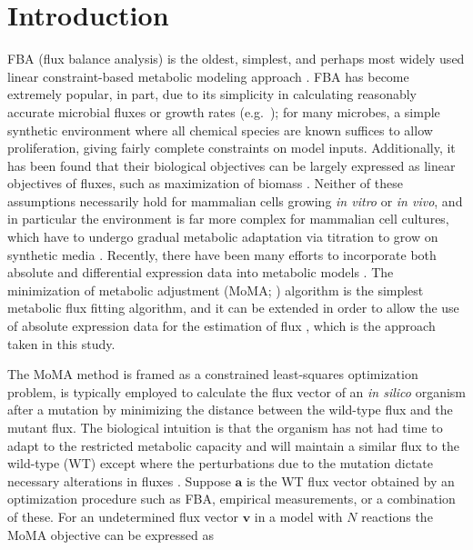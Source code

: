 \section{Introduction}

%
%
FBA (flux balance analysis) is the oldest, simplest, and perhaps
most widely used linear constraint-based metabolic modeling approach
\citep{Shestov2013a,Lewis2012}. FBA has become extremely popular, in
part, due to its simplicity in calculating reasonably accurate
microbial fluxes or growth rates
(e.g.\ \citealt{Schuetz2012,Fong2004_sb2013}); for
many microbes, a simple synthetic environment where all chemical
species are known suffices to allow proliferation, giving fairly
complete constraints on model inputs. Additionally, it has been found
that their biological objectives can be largely expressed as linear
objectives of fluxes, such as maximization of biomass \citep{Schuetz2012}. 
Neither of these assumptions necessarily hold for mammalian cells growing \textit{in
  vitro} or \textit{in vivo}, and in particular the environment is far
more complex for mammalian cell cultures, which have to undergo
gradual metabolic adaptation via titration to grow on synthetic media
\citep{Pirkmajer2011}. Recently, there have been many efforts to
incorporate both absolute and differential expression data into
metabolic models \citep{Blazier2012}. The minimization of metabolic
adjustment (MoMA; \citealt{Segre2002}) algorithm is the simplest
metabolic flux fitting algorithm, and it can be extended in order to
allow the use of absolute expression data for the estimation of flux
\citep{Lee2012}, which is the approach taken in this study.


The MoMA method is framed as a constrained least-squares optimization
problem, is typically employed to calculate the flux vector of an
\textit{in silico} organism after a mutation by minimizing the distance
between the wild-type flux and the mutant flux. The biological
intuition is that the organism has not had time to adapt to the
restricted metabolic capacity and will maintain a similar flux to the
wild-type (WT) except where the perturbations due to the mutation
dictate necessary alterations in fluxes \citep{Shlomi2005}. Suppose
$\mathbf{a}$ is the WT flux vector obtained by an optimization
procedure such as FBA, empirical measurements, or a combination of
these. For an undetermined flux vector $\mathbf{v}$ in a model with
$N$ reactions the MoMA objective can be expressed as

